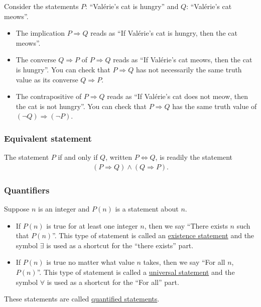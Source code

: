 \begin{example}
Consider the statements $P$: ``Valérie's cat is hungry'' and $Q$: ``Valérie's cat meows''. 
	\begin{itemize}
	\item The implication $P \Rightarrow Q$ reads as ``If Valérie's cat is hungry, then the cat meows''. 
	\item The converse $Q \Rightarrow P$ of $P \Rightarrow Q$ reads as ``If Valérie's cat meows, then the cat is hungry''. You can check that $P \Rightarrow Q$ has not necessarily the same truth value as its converse $Q \Rightarrow P$. 
	\item The contrapositive of $P \Rightarrow Q$ reads as ``If Valérie's cat does not meow, then the cat is not hungry''. You can check that $P \Rightarrow Q$ has the same truth value of $(\neg Q) \Rightarrow (\neg P)$.
	\end{itemize}
\end{example}

\subsubsection*{Equivalent statement}

\begin{definition}
The statement $P$ if and only if $Q$, written $P \iff Q$, is readily the statement
	\begin{align*}
	(P \Rightarrow Q) \wedge (Q \Rightarrow P) .
	\end{align*}
\end{definition}

\subsubsection*{Quantifiers}

Suppose $n$ is an integer and $P(n)$ is a statement about $n$. 
	\begin{itemize}
	\item If $P (n)$ is true for at least one integer $n$, then we say ``There exists $n$ such that $P (n)$''. This type of statement is called an \underline{existence statement} and the symbol $\exists$ is used as a shortcut for the ``there exists'' part.
	\item If $P(n)$ is true no matter what value $n$ takes, then we say ``For all $n$, $P (n)$''. This type of statement is called a \underline{universal statement} and the symbol $\forall$ is used as a shortcut for the ``For all'' part.
	\end{itemize}
These statements are called \underline{quantified statements}.

